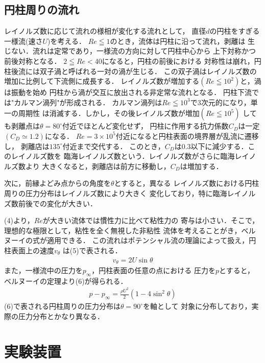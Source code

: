 \documentclass[twocolumn,10pt,a4j]{jsarticle}
\begin{document}
  \subsection{円柱周りの流れ}
    レイノルズ数に応じて流れの様相が変化する流れとして，
    直径$d$の円柱をすぎる一様流(速さ$U$)を考える．
    $Re \leqq 1$のとき，流体は円柱に沿って流れ，剥離は
    生じない．流れは定常であり，一様流の方向に対して円柱中心から
    上下対称かつ前後対称となる．
    $2 \leqq Re < 40$になると，円柱の前後における
    対称性は崩れ，円柱後流には双子渦と呼ばれる一対の渦が生じる．
    この双子渦はレイノルズ数の増加に比例して下流側に成長する．
    レイノルズ数が増加する$(Re \leqq 10^2)$と，渦は振動を始め
    円柱から渦が交互に放出される非定常な流れとなる．
    円柱下流では"カルマン渦列"が形成される．
    カルマン渦列は$Re \leqq 10^3$で3次元的になり，単一の周期性
    は消滅する．しかし，その後レイノルズ数が増加$(Re \leqq 10^5)$
    しても剥離点は$\theta = 80^\circ$付近でほとんど変化せず，
    円柱に作用する抗力係数$C_{D}$は一定$(C_{D} \simeq 1.2)$になる．
    $Re = 3 \times 10^5$付近になると円柱表面の境界層が乱流に遷移し，
    剥離店は$135^\circ$付近まで交代する．
    このとき，$C_{D}$は0.3以下に減少する．このレイノルズ数を
    臨海レイノルズ数という．レイノルズ数がさらに臨海レイノルズ数より
    大きくなると，剥離店は前方に移動し，$C_{D}$は増加する．
      \par 次に，前縁よどみ点からの角度を$\theta$とすると，異なる
    レイノルズ数における円柱周りの圧力分布はレイノルズ数により大きく
    変化しており，特に臨海レイノルズ数前後での変化が大きい．
      \par (4)より，$Re$が大きい流体では慣性力に比べて粘性力の
    寄与は小さい．そこで，理想的な極限として，粘性を全く無視した非粘性
    流体を考えることがき，ベルヌーイの式が適用できる．
    この流れはポテンシャル流の理論によって扱え，円柱表面上の速度$v_{\theta}$
    は(5)で表される．
      \begin{eqnarray}
        v_{\theta} = 2U \sin \theta
      \end{eqnarray}
    また，一様流中の圧力を$p_{\infty}$，円柱表面の任意の点における
    圧力を$p$とすると，ベルヌーイの定理より(6)が得られる．
      \begin{eqnarray}
        p - p_{\infty} = \frac{\rho U^2}{2}(1 - 4\sin^2 \theta)
      \end{eqnarray}
    (6)で表される円柱周りの圧力分布は$\theta = 90^\circ$を軸として
    対象に分布しており，実際の圧力分布とかなり異なる．

\section{実験装置}
\end{document}

